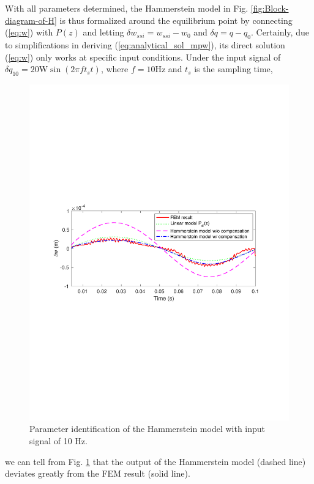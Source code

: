 \documentclass [11pt, proquest] {uwthesis}[2020/02/24]
\begin{document}
With all parameters determined, the Hammerstein model in Fig. \ref{fig:Block-diagram-of-H}
is thus formalized around the equilibrium point by connecting (\ref{eq:w})
with $P(z)$ and letting $\delta w_{ssi}=w_{ssi}-w_{0}$ and $\delta q=q-q_{0}$.
Certainly, due to simplifications in deriving (\ref{eq:analytical_sol_mpw}),
its direct solution (\ref{eq:w}) only works at specific input conditions.
Under the input signal of $\delta q_{10}=20\text{W}\sin(2\pi ft_{s}t)$,
where $f=10\text{Hz}$ and $t_{s}$ is the sampling time, 
\begin{figure}[!ht]
\begin{centering}
\includegraphics[clip,width=13cm]{Hammerstein/parameterID}
\par\end{centering}
\centering{}\caption{\label{fig:Parameter-identification-of}Parameter identification of
the Hammerstein model with input signal of 10 Hz.}
\end{figure}
we can tell from Fig. \ref{fig:Parameter-identification-of} that
the output of the Hammerstein model (dashed line) deviates greatly
from the FEM result (solid line).
\end{document}
